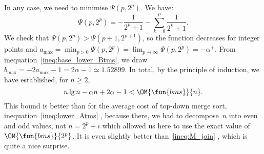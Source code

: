 In any case, we need to minimise \(\Psi(p,2^p)\). We have:
\begin{equation*}
\Psi(p,2^p) = - \frac{1}{2^p+1} - \sum_{k=0}^{p}\frac{1}{2^k+1}.
\end{equation*}
We check that \(\Psi(p,2^p) > \Psi(p+1,2^{p+1})\), so the function
decreases for integer points and \(a_{\max} = \min_{p > 0}\Psi(p,2^p)
= \lim_{p \to \infty}\Psi(p,2^p) = -\alpha^{+}\). From
inequation~\eqref{ineq:base_lower_Btms}, we draw \(b_{\max} =
-2a_{\max} - 1 = 2\alpha - 1 \simeq 1.52899\). In total, by the
principle of induction, we have established, for \(n \geqslant 2\),
\begin{equation*}
n\lg n - \alpha n + 2\alpha -1 < \OM{\fun{bms}}{n}.
\end{equation*}
This bound is better than for the average cost of top\hyp{}down merge
sort, inequation~\eqref{ineq:lower_Atms} ,
because there, we had to decompose~\(n\) into even and odd values, not
\(n=2^p+i\) which allowed us here to use the exact value of
\(\OM{\fun{bms}}{2^p}\). It is even slightly better
than~\eqref{ineq:M_join} , which is quite a nice
surprise.

